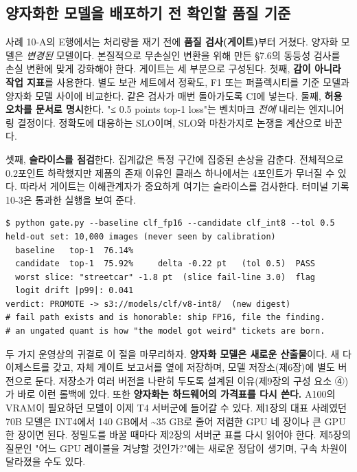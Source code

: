 \subsection*{양자화한 모델을 배포하기 전 확인할 품질 기준}

사례 10-A의 E행에서는 처리량을 재기 전에 \textbf{품질 검사(게이트)}부터 거쳤다. 양자화 모델은 \textit{변경된} 모델이다. 본질적으로 무손실인 변환을 위해 만든 §7.6의 동등성 검사를 손실 변환에 맞게 강화해야 한다. 게이트는 세 부분으로 구성된다. 첫째, \textbf{감이 아니라 작업 지표}를 사용한다. 별도 보관 세트에서 정확도, F1 또는 퍼플렉시티를 기준 모델과 양자화 모델 사이에 비교한다. 같은 검사가 매번 돌아가도록 CI에 넣는다. 둘째, \textbf{허용 오차를 문서로 명시}한다. "≤ 0.5 points top-1 loss"는 벤치마크 \textit{전에} 내리는 엔지니어링 결정이다. 정확도에 대응하는 SLO이며, SLO와 마찬가지로 논쟁을 계산으로 바꾼다.

셋째, \textbf{슬라이스를 점검}한다. 집계값은 특정 구간에 집중된 손상을 감춘다. 전체적으로 0.2포인트 하락했지만 제품의 존재 이유인 클래스 하나에서는 4포인트가 무너질 수 있다. 따라서 게이트는 이해관계자가 중요하게 여기는 슬라이스를 검사한다. 터미널 기록 10-3은 통과한 실행을 보여 준다.

\begin{terminalbox}
\begin{Verbatim}[breaklines=true,breakanywhere=true,fontsize=\small,formatcom=\color{tbbtermfg},codes=\tbbcodeactive]
$ python gate.py --baseline clf_fp16 --candidate clf_int8 --tol 0.5
held-out set: 10,000 images (never seen by calibration)
  baseline   top-1  76.14%
  candidate  top-1  75.92%     delta -0.22 pt   (tol 0.5)  PASS
  worst slice: "streetcar" -1.8 pt  (slice fail-line 3.0)  flag
  logit drift |p99|: 0.041
verdict: PROMOTE -> s3://models/clf/v8-int8/  (new digest)
# fail path exists and is honorable: ship FP16, file the finding.
# an ungated quant is how "the model got weird" tickets are born.
\end{Verbatim}
\end{terminalbox}

두 가지 운영상의 귀결로 이 절을 마무리하자. \textbf{양자화 모델은 새로운 산출물}이다. 새 다이제스트를 갖고, 자체 게이트 보고서를 옆에 저장하며, 모델 저장소(제6장)에 별도 버전으로 둔다. 저장소가 여러 버전을 나란히 두도록 설계된 이유(제9장의 구성 요소 ④)가 바로 이런 롤백에 있다. 또한 \textbf{양자화는 하드웨어의 가격표를 다시 쓴다.} A100의 VRAM이 필요하던 모델이 이제 T4 서버군에 들어갈 수 있다. 제1장의 대표 사례였던 70B 모델은 INT4에서 140 GB에서 \textasciitilde{}35 GB로 줄어 저렴한 GPU 네 장이나 큰 GPU 한 장이면 된다. 정밀도를 바꿀 때마다 제2장의 서버군 표를 다시 읽어야 한다. 제5장의  질문인 "어느 GPU 레이블을 겨냥할 것인가?"에는 새로운 정답이 생기며, 구속 차원이 달라졌을 수도 있다.

